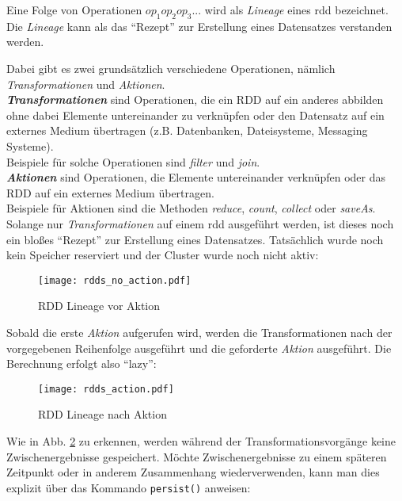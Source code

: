 Eine Folge von Operationen $op_1op_2op_3...$ wird als \textit{Lineage} eines \gls{rdd} bezeichnet. Die \textit{Lineage} kann als das "`Rezept"' zur Erstellung eines Datensatzes verstanden werden.

Dabei gibt es zwei grundsätzlich verschiedene Operationen, nämlich \textit{Transformationen} und \textit{Aktionen}.\\

\textbf{\textit{Transformationen}} sind Operationen, die ein \gls{RDD} auf ein anderes abbilden ohne dabei Elemente untereinander zu verknüpfen oder den Datensatz auf ein externes Medium übertragen (z.B. Datenbanken, Dateisysteme, Messaging Systeme).\\
Beispiele für solche Operationen sind \textit{filter} und \textit{join}.\\

\textbf{\textit{Aktionen}} sind Operationen, die Elemente untereinander verknüpfen oder das \gls{RDD} auf ein externes Medium übertragen.\\
Beispiele für Aktionen sind die Methoden \textit{reduce}, \textit{count}, \textit{collect} oder \textit{saveAs}.\\

Solange nur \textit{Transformationen} auf einem \gls{rdd} ausgeführt werden, ist dieses noch ein bloßes "`Rezept"' zur Erstellung eines Datensatzes. Tatsächlich wurde noch kein Speicher reserviert und der Cluster wurde noch nicht aktiv\cite{Mat12}:\\

\begin{figure}[ht!]
	\centering
  \texttt{[image: rdds\_no\_action.pdf]}
	\caption{RDD Lineage vor Aktion}
	\label{fig:rdds_no_action}
\end{figure}

Sobald die erste \textit{Aktion} aufgerufen wird, werden die Transformationen nach der vorgegebenen Reihenfolge ausgeführt und die geforderte \textit{Aktion} ausgeführt. Die Berechnung erfolgt also "`lazy"':\\

\begin{figure}[ht!]
	\centering
  \texttt{[image: rdds\_action.pdf]}
	\caption{RDD Lineage nach Aktion}
	\label{fig:rdds_action}
\end{figure}

Wie in Abb. \ref{fig:rdds_action} zu erkennen, werden während der Transformationsvorgänge keine Zwischenergebnisse gespeichert. Möchte Zwischenergebnisse zu einem späteren Zeitpunkt oder in anderem Zusammenhang wiederverwenden, kann man dies explizit über das Kommando \lstinline|persist()| anweisen:\\

